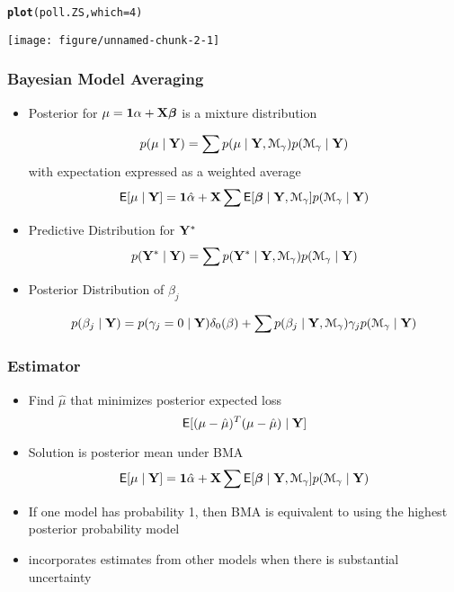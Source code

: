 \documentclass[handout]{beamer}\usepackage[]{graphicx}\usepackage[]{color}
\makeatletter
\def\maxwidth{ %
  \ifdim\Gin@nat@width>\linewidth
    \linewidth
  \else
    \Gin@nat@width
  \fi
}
\newcommand{\hlnum}[1]{\textcolor[rgb]{0.686,0.059,0.569}{#1}}%
\newcommand{\hlstd}[1]{\textcolor[rgb]{0.345,0.345,0.345}{#1}}%
\newcommand{\hlkwc}[1]{\textcolor[rgb]{0.333,0.667,0.333}{#1}}%
\newcommand{\hlkwd}[1]{\textcolor[rgb]{0.737,0.353,0.396}{\textbf{#1}}}%
\newenvironment{kframe}{%
 \def\at@end@of@kframe{}%
 \ifinner\ifhmode%
  \def\at@end@of@kframe{\end{minipage}}%
  \begin{minipage}{\columnwidth}%
 \fi\fi%
 \def\FrameCommand##1{\hskip\@totalleftmargin \hskip-\fboxsep
 \colorbox{shadecolor}{##1}\hskip-\fboxsep
     \hskip-\linewidth \hskip-\@totalleftmargin \hskip\columnwidth}%
 \MakeFramed {\advance\hsize-\width
   \@totalleftmargin\z@ \linewidth\hsize
   \@setminipage}}%
 {\par\unskip\endMakeFramed%
 \at@end@of@kframe}
\newenvironment{knitrout}{}{} %
\makeatother
\begin{document}
\begin{frame}
\begin{knitrout}
\color{fgcolor}\begin{kframe}
\begin{alltt}
\hlkwd{plot}\hlstd{(poll.ZS,} \hlkwc{which}\hlstd{=}\hlnum{4}\hlstd{)}
\end{alltt}
\end{kframe}

{\centering \texttt{[image: figure/unnamed-chunk-2-1]} 

}



\end{knitrout}
\end{frame}

\begin{frame} \frametitle{Bayesian Model Averaging}

\begin{itemize}
\item Posterior for $\mu = \mathbf{1} \alpha + \mathbf{X} \boldsymbol{\beta}$ is a mixture distribution

$$p(\mu \mid \mathbf{Y}) = \sum p(\mu \mid \mathbf{Y}, {\cal M}_\gamma) p({\cal M}_\gamma \mid \mathbf{Y})$$ \pause
with expectation expressed as a weighted average
$$\textsf{E}[\mu \mid \mathbf{Y}] = \mathbf{1} \hat{\alpha} +  \mathbf{X} \sum \textsf{E}[\boldsymbol{\beta} \mid \mathbf{Y}, {\cal M}_\gamma] p({\cal M}_\gamma \mid \mathbf{Y})$$
\pause
\item Predictive Distribution for $\mathbf{Y}^*$
$$p(\mathbf{Y}^* \mid \mathbf{Y}) = \sum p(\mathbf{Y}^* \mid \mathbf{Y}, {\cal M}_\gamma) p({\cal M}_\gamma \mid \mathbf{Y})$$
\pause
\item Posterior Distribution of $\beta_j$

$$p(\beta_j \mid \mathbf{Y}) = p(\gamma_j = 0 \mid \mathbf{Y}) \delta_0(\beta) + \sum p(\beta_j \mid \mathbf{Y}, {\cal M}_\gamma) \gamma_j p({\cal M}_\gamma \mid \mathbf{Y}) $$
\end{itemize}

\end{frame}

\begin{frame} \frametitle{Estimator}

\begin{itemize}
\item Find $\hat{\mu}$ that minimizes posterior expected loss
$$\textsf{E}[(\mu - \hat{\mu})^T(\mu - \hat{\mu}) \mid \mathbf{Y}]$$ \pause
\item Solution is posterior mean under BMA
$$\textsf{E}[\mu \mid \mathbf{Y}] = \mathbf{1} \hat{\alpha} +  \mathbf{X} \sum \textsf{E}[\boldsymbol{\beta} \mid \mathbf{Y}, {\cal M}_\gamma] p({\cal M}_\gamma \mid \mathbf{Y})$$ \pause
\item If one model has probability 1, then BMA is equivalent to using the highest posterior probability model \pause
\item incorporates estimates from other models when there is substantial uncertainty
\end{itemize}

\end{frame}
\end{document}
